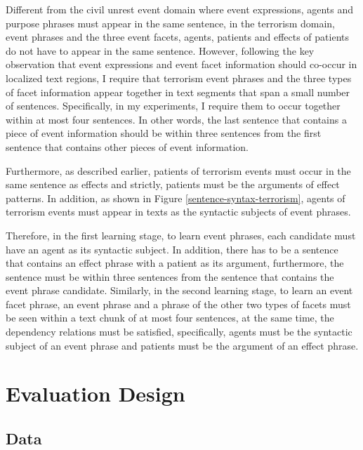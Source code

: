 Different from the civil unrest event domain where event expressions,  
agents and purpose phrases must appear in the same sentence, 
in the terrorism domain, event phrases and the three event facets, 
agents, patients and effects of patients do not have to appear in the same 
sentence.
However, following the key observation that 
event expressions and event facet information should co-occur in 
localized text regions, I require that terrorism event phrases and 
the three types of facet information appear together in text segments 
that span a small number of sentences. 
Specifically, in my experiments, I require them to 
occur together within at most four sentences. 
In other words, the last sentence that contains a piece of event information 
should be within three sentences from the first sentence that 
contains other pieces of event information. 

Furthermore, as described earlier, patients of terrorism events 
must occur in the same sentence as effects and strictly, 
patients must be the arguments of effect patterns. 
In addition, as shown in Figure \ref{sentence-syntax-terrorism}, 
agents of terrorism events must appear in texts as the syntactic subjects 
of event phrases. 

Therefore, in the first learning stage, to learn event phrases, 
each candidate must have an agent as its syntactic subject. 
In addition, there has to be a sentence that contains an effect phrase 
with a patient as its argument, furthermore, the sentence must be within 
three sentences from the sentence that contains the event phrase candidate. 
Similarly, in the second learning stage, 
to learn an event facet phrase, an event phrase and a phrase of the other 
two types of facets must be seen within a text chunk of 
at most four sentences, at the same time, the dependency relations 
must be satisfied, specifically, agents must be the syntactic subject of 
an event phrase and patients must be the argument of an effect phrase. 




\section{Evaluation Design}
\subsection{Data}

